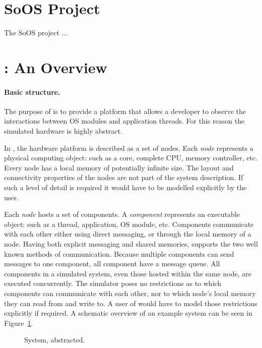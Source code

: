 \section{SoOS Project}
\label{sec:soos-project}

The SoOS project  \cite{soos}...

\section{\soosim: An Overview}
\label{sec:soosim-an-overview}

\paragraph{Basic structure.} 
The purpose of \soosim is to provide a platform that allows a developer to observe the interactions between OS modules and application threads.
For this reason the simulated hardware is highly abstract.

In \soosim, the hardware platform is described as a set of nodes.
Each \emph{node} represents a physical computing object: such as a core, complete CPU, memory controller, etc.
Every node has a local memory of potentially infinite size.
The layout and connectivity properties of the nodes are not part of the system description.
If such a level of detail is required it would have to be modelled explicitly by the user.

Each \emph{node} hosts a set of components.
A \emph{component} represents an executable object: such as a thread, application, OS module, etc.
Components communicate with each other either using direct messaging, or through the local memory of a node.
Having both explicit messaging and shared memories, \soosim supports the two well known methods of communication.
Because multiple components can send messages to one component, all component have a message queue.
All components in a simulated system, even those hosted within the same node, are executed concurrently.
The simulator poses no restrictions as to which components can communicate with each other, nor to which node's local memory they can read from and write to.
A user of \soosim would have to model those restrictions explicitly if required.
A schematic overview of an example system can be seen in Figure~\ref{fig:system}.

\def\svgwidth{\columnwidth}
\begin{figure}

\caption{System, abstracted.}
\label{fig:system}
\end{figure}

